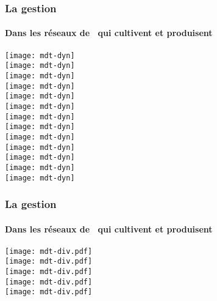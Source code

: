 \begin{frame}
\frametitle{La gestion \insitu}
\framesubtitle{Dans les réseaux de \MSPs~qui cultivent et produisent}

\begin{overprint}
\centering\texttt{[image: mdt-dyn]}\\
\centering\texttt{[image: mdt-dyn]}\\
\centering\texttt{[image: mdt-dyn]}\\
\centering\texttt{[image: mdt-dyn]}\\
\centering\texttt{[image: mdt-dyn]}\\
\centering\texttt{[image: mdt-dyn]}\\
\centering\texttt{[image: mdt-dyn]}\\
\centering\texttt{[image: mdt-dyn]}\\
\centering\texttt{[image: mdt-dyn]}\\
\centering\texttt{[image: mdt-dyn]}\\
\centering\texttt{[image: mdt-dyn]}\\
\centering\texttt{[image: mdt-dyn]}\\
\centering\texttt{[image: mdt-dyn]}\\
\end{overprint}

\end{frame}


\begin{frame}
\frametitle{La gestion \insitu}
\framesubtitle{Dans les réseaux de \MSPs~qui cultivent et produisent}


\begin{overprint}
\centering\texttt{[image: mdt-div.pdf]}\\
\centering\texttt{[image: mdt-div.pdf]}\\
\centering\texttt{[image: mdt-div.pdf]}\\
\centering\texttt{[image: mdt-div.pdf]}\\
\centering\texttt{[image: mdt-div.pdf]}\\
\end{overprint}

\end{frame}

